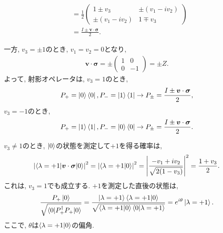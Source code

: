 \begin{ex}
\begin{align*}
         & =
        \frac{1}{2}
        \begin{pmatrix}
            1\pm v_3         & \pm(v_1 - i v_2) \\
            \pm(v_1 - i v_2) & 1\mp v_3
        \end{pmatrix}                    \\
         & =
        \frac{I \pm \bm{v} \cdot \bm{\sigma}}{2}.
    \end{align*}
    \par
    一方, $v_3 = \pm 1$のとき, $v_1 = v_2 = 0$となり,
    \begin{align*}
        \bm{v} \cdot \bm{\sigma}
        =
        \pm
        \begin{pmatrix}
            1 & 0   \\
            0 & - 1
        \end{pmatrix}
        =
        \pm Z.
    \end{align*}
    よって, 射影オペレータは, $v_3 = 1$のとき, 
    \begin{align*}
        P_{+} = \ket{0}\bra{0},
        P_{-} = \ket{1}\bra{1}
        \to
        P_{\pm} = \frac{I \pm \bm{v} \cdot \bm{\sigma}}{2},
    \end{align*}
    $v_3 = -1$のとき, 
    \begin{align*}
        P_{+} = \ket{1}\bra{1},
        P_{-} = \ket{0}\bra{0}
        \to
        P_{\pm} = \frac{I \pm \bm{v} \cdot \bm{\sigma}}{2}.
    \end{align*}
\end{ex}

\begin{ex}
    \label{ex2.61}
    $v_3\neq 1$のとき,
    $\ket{0}$の状態を測定して$+1$を得る確率は,
    \begin{align*}
        \left|
        \braket{\lambda = +1 | \bm{v} \cdot \bm{\sigma} | 0}
        \right|^2
        =
        \left|
        \braket{\lambda = +1 | 0}
        \right|^2
        =
        \left|
        \frac{-v_1 + iv_2}{\sqrt{2(1-v_3)}}
        \right|^2
        =
        \frac{1+v_3}{2}.
    \end{align*}
    これは, $v_3 = 1$でも成立する.
    $+1$を測定した直後の状態は,
    \begin{align*}
        \frac{P_+ \ket{0}}{\sqrt{\braket{0 | P_+^\dagger P_+ | 0}}}
        =
        \frac{\ket{\lambda = +1}\braket{\lambda = +1|0}}{\sqrt{\braket{\lambda = +1 | 0}\braket{0 | \lambda = +1}}}
        =
        e^{i\theta} \ket{\lambda=+1}.
    \end{align*}
    ここで, $\theta$は$\braket{\lambda = +1 | 0}$の偏角.
\end{ex}

